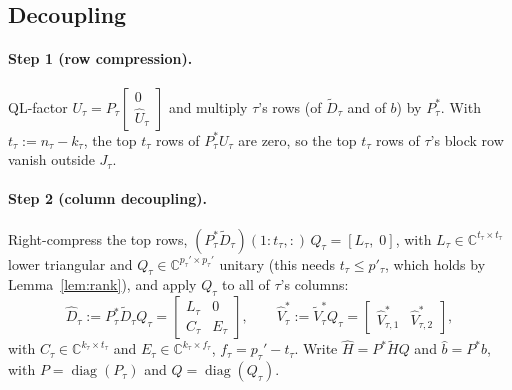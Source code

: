 \subsection{Decoupling}\label{subsec:decoupling}
\paragraph{Step 1 (row compression).} QL-factor $U_\tau=P_\tau\begin{bmatrix}0\\ \hat U_\tau\end{bmatrix}$
and multiply $\tau$'s rows (of $\tilde D_\tau$ and of $b$) by $P_\tau^*$. With $t_\tau:=n_\tau-k_\tau$, the
top $t_\tau$ rows of $P_\tau^*U_\tau$ are zero, so the top $t_\tau$ rows of $\tau$'s block row vanish
outside $J_\tau$.

\paragraph{Step 2 (column decoupling).} Right-compress the top rows,
$(P_\tau^*\tilde D_\tau)(1{:}t_\tau,:)\,Q_\tau=[L_\tau,\;0]$, with $L_\tau\in\mathbb{C}^{t_\tau\times t_\tau}$
lower triangular and $Q_\tau\in\mathbb{C}^{p_\tau'\times p_\tau'}$ unitary (this needs $t_\tau\le p'_\tau$, which
holds by Lemma~\ref{lem:rank}), and apply $Q_\tau$ to all of $\tau$'s columns:
\begin{equation}\label{eq:decoupled}
\hat D_\tau:=P_\tau^*\tilde D_\tau Q_\tau=\begin{bmatrix}L_\tau & 0\\ C_\tau & E_\tau\end{bmatrix},\qquad
\hat V_\tau^*:=\tilde V_\tau^*Q_\tau=\begin{bmatrix}\hat V_{\tau,1}^* & \hat V_{\tau,2}^*\end{bmatrix},
\end{equation}
with $C_\tau\in\mathbb{C}^{k_\tau\times t_\tau}$ and $E_\tau\in\mathbb{C}^{k_\tau\times f_\tau}$,
$f_\tau=p_\tau'-t_\tau$. Write $\hat H=P^*\tilde HQ$ and $\hat b=P^*b$, with
$P=\operatorname{diag}(P_\tau)$ and $Q=\operatorname{diag}(Q_\tau)$.

